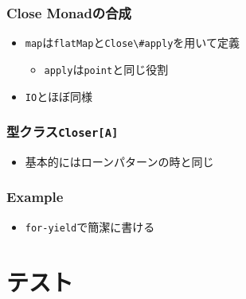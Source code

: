 \begin{frame}
  \frametitle{Close Monadの合成}

  

  

  \begin{itemize}
    \item<2-> \lstinline|map|は\lstinline|flatMap|と\lstinline|Close\#apply|を用いて定義
    \begin{itemize}
      \item<3-> \lstinline|apply|は\lstinline|point|と同じ役割
    \end{itemize}
    \item<4-> \lstinline|IO|とほぼ同様
  \end{itemize}
\end{frame}

\begin{frame}
  \frametitle{型クラス\protect\lstinline|Closer[A]|}

  

  \begin{itemize}
    \item<2-> 基本的にはローンパターンの時と同じ
  \end{itemize}
\end{frame}

\begin{frame}
  \frametitle{Example}

  

  \begin{itemize}
    \item<2-> \lstinline|for-yield|で簡潔に書ける
  \end{itemize}
\end{frame}

\section{テスト}

\begin{frame}
  \begin{center}

  \end{center}  
\end{frame}

